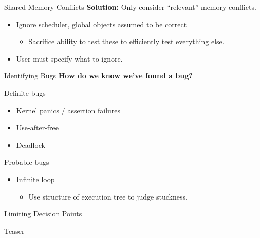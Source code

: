 \documentclass[xcolor=dvipsnames]{beamer}
\begin{document}
\begin{frame}{Shared Memory Conflicts}
	\textbf{Solution:} Only consider ``relevant'' memory conflicts.
	\begin{itemize}
		\item Ignore scheduler, global objects assumed to be correct
		\begin{itemize}
			\item Sacrifice ability to test these to efficiently test everything else.
		\end{itemize}
		\item User must specify what to ignore.
	\end{itemize}
\end{frame}

\begin{frame}{Identifying Bugs}
	\textbf{How do we know we've found a bug?}
	\linegap

	Definite bugs
	\begin{itemize}
		\item Kernel panics / assertion failures
		\item Use-after-free
		\item Deadlock
	\end{itemize}
	Probable bugs
	\begin{itemize}
		\item Infinite loop
		\begin{itemize}
			\item Use structure of execution tree to judge stuckness.
		\end{itemize}
	\end{itemize}
\end{frame}
\begin{frame}{Limiting Decision Points}
\end{frame}
\begin{frame}{Teaser}
\end{frame}
\end{document}
